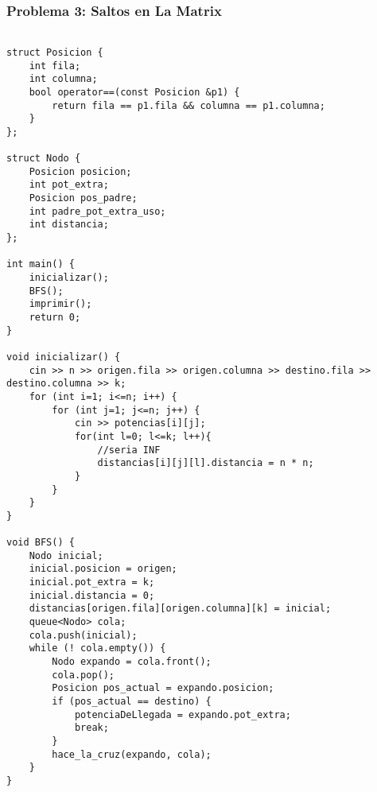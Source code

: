 \documentclass[11pt, a4paper, twoside]{article}
\begin{document}
\subsubsection{Problema 3: Saltos en La Matrix}

\begin{lstlisting}

struct Posicion {
    int fila;
    int columna;
    bool operator==(const Posicion &p1) {
        return fila == p1.fila && columna == p1.columna;
    }
};

struct Nodo {
    Posicion posicion;
    int pot_extra;
    Posicion pos_padre;
    int padre_pot_extra_uso;
    int distancia;
};

int main() {
    inicializar();
    BFS();
    imprimir();
    return 0;
}

void inicializar() {
    cin >> n >> origen.fila >> origen.columna >> destino.fila >> destino.columna >> k;
    for (int i=1; i<=n; i++) {
        for (int j=1; j<=n; j++) {
            cin >> potencias[i][j];
            for(int l=0; l<=k; l++){
                //seria INF
                distancias[i][j][l].distancia = n * n;
            }
        }
    }
}

void BFS() {
    Nodo inicial;
    inicial.posicion = origen;
    inicial.pot_extra = k;
    inicial.distancia = 0;
    distancias[origen.fila][origen.columna][k] = inicial;
    queue<Nodo> cola;
    cola.push(inicial);
    while (! cola.empty()) {
        Nodo expando = cola.front();
        cola.pop();
        Posicion pos_actual = expando.posicion;
        if (pos_actual == destino) {
            potenciaDeLlegada = expando.pot_extra;
            break;
        }
        hace_la_cruz(expando, cola);
    }
}


\end{lstlisting}
\end{document}
